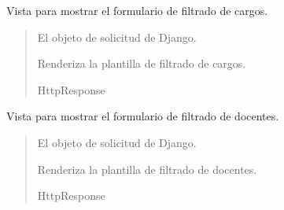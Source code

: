 \documentclass[letterpaper,10pt,spanish]{sphinxmanual}
\begin{document}
\begin{fulllineitems}

\pysigstartsignatures
{}
\pysigstopsignatures
\sphinxAtStartPar
Vista para mostrar el formulario de filtrado de cargos.
\begin{quote}\begin{description}
\sphinxAtStartPar
{} \textendash{} El objeto de solicitud de Django.

\sphinxAtStartPar
Renderiza la plantilla de filtrado de cargos.

\sphinxAtStartPar
HttpResponse

\end{description}\end{quote}

\end{fulllineitems}



\begin{fulllineitems}

\pysigstartsignatures
{}
\pysigstopsignatures
\sphinxAtStartPar
Vista para mostrar el formulario de filtrado de docentes.
\begin{quote}\begin{description}
\sphinxAtStartPar
{} \textendash{} El objeto de solicitud de Django.

\sphinxAtStartPar
Renderiza la plantilla de filtrado de docentes.

\sphinxAtStartPar
HttpResponse

\end{description}\end{quote}

\end{fulllineitems}
\end{document}
